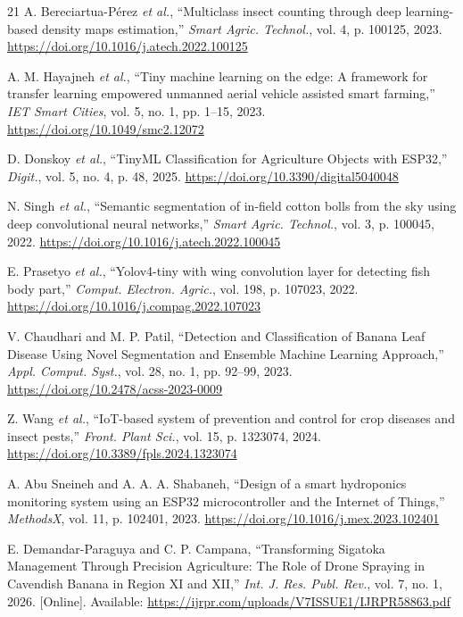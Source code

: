 \documentclass[conference]{IEEEtran}
\begin{document}
\begin{thebibliography}{21}
 A. Bereciartua-P\'erez \textit{et al.}, ``Multiclass insect counting through deep learning-based density maps estimation,'' \textit{Smart Agric. Technol.}, vol. 4, p. 100125, 2023. \url{https://doi.org/10.1016/j.atech.2022.100125}

 A. M. Hayajneh \textit{et al.}, ``Tiny machine learning on the edge: A framework for transfer learning empowered unmanned aerial vehicle assisted smart farming,'' \textit{IET Smart Cities}, vol. 5, no. 1, pp. 1--15, 2023. \url{https://doi.org/10.1049/smc2.12072}

 D. Donskoy \textit{et al.}, ``TinyML Classification for Agriculture Objects with ESP32,'' \textit{Digit.}, vol. 5, no. 4, p. 48, 2025. \url{https://doi.org/10.3390/digital5040048}

 N. Singh \textit{et al.}, ``Semantic segmentation of in-field cotton bolls from the sky using deep convolutional neural networks,'' \textit{Smart Agric. Technol.}, vol. 3, p. 100045, 2022. \url{https://doi.org/10.1016/j.atech.2022.100045}

 E. Prasetyo \textit{et al.}, ``Yolov4-tiny with wing convolution layer for detecting fish body part,'' \textit{Comput. Electron. Agric.}, vol. 198, p. 107023, 2022. \url{https://doi.org/10.1016/j.compag.2022.107023}

 V. Chaudhari and M. P. Patil, ``Detection and Classification of Banana Leaf Disease Using Novel Segmentation and Ensemble Machine Learning Approach,'' \textit{Appl. Comput. Syst.}, vol. 28, no. 1, pp. 92--99, 2023. \url{https://doi.org/10.2478/acss-2023-0009}

 Z. Wang \textit{et al.}, ``IoT-based system of prevention and control for crop diseases and insect pests,'' \textit{Front. Plant Sci.}, vol. 15, p. 1323074, 2024. \url{https://doi.org/10.3389/fpls.2024.1323074}

 A. Abu Sneineh and A. A. A. Shabaneh, ``Design of a smart hydroponics monitoring system using an ESP32 microcontroller and the Internet of Things,'' \textit{MethodsX}, vol. 11, p. 102401, 2023. \url{https://doi.org/10.1016/j.mex.2023.102401}

 E. Demandar-Paraguya and C. P. Campana, ``Transforming Sigatoka Management Through Precision Agriculture: The Role of Drone Spraying in Cavendish Banana in Region XI and XII,'' \textit{Int. J. Res. Publ. Rev.}, vol. 7, no. 1, 2026. [Online]. Available: \url{https://ijrpr.com/uploads/V7ISSUE1/IJRPR58863.pdf}


\end{thebibliography}
\end{document}
